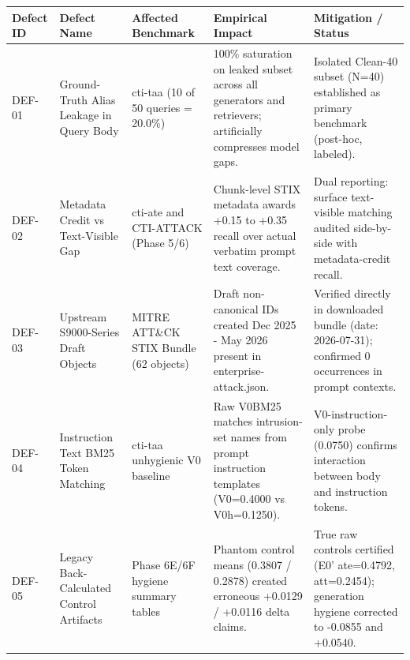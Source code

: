 \begin{tabular}{lllll}
\toprule
Defect ID & Defect Name & Affected Benchmark & Empirical Impact & Mitigation / Status \\
\midrule
DEF-01 & Ground-Truth Alias Leakage in Query Body & cti-taa (10 of 50 queries = 20.0\%) & 100\% saturation on leaked subset across all generators and retrievers; artificially compresses model gaps. & Isolated Clean-40 subset (N=40) established as primary benchmark (post-hoc, labeled). \\
DEF-02 & Metadata Credit vs Text-Visible Gap & cti-ate and CTI-ATTACK (Phase 5/6) & Chunk-level STIX metadata awards +0.15 to +0.35 recall over actual verbatim prompt text coverage. & Dual reporting: surface text-visible matching audited side-by-side with metadata-credit recall. \\
DEF-03 & Upstream S9000-Series Draft Objects & MITRE ATT\&CK STIX Bundle (62 objects) & Draft non-canonical IDs created Dec 2025 - May 2026 present in enterprise-attack.json. & Verified directly in downloaded bundle (date: 2026-07-31); confirmed 0 occurrences in prompt contexts. \\
DEF-04 & Instruction Text BM25 Token Matching & cti-taa unhygienic V0 baseline & Raw V0BM25 matches intrusion-set names from prompt instruction templates (V0=0.4000 vs V0h=0.1250). & V0-instruction-only probe (0.0750) confirms interaction between body and instruction tokens. \\
DEF-05 & Legacy Back-Calculated Control Artifacts & Phase 6E/6F hygiene summary tables & Phantom control means (0.3807 / 0.2878) created erroneous +0.0129 / +0.0116 delta claims. & True raw controls certified (E0' ate=0.4792, att=0.2454); generation hygiene corrected to -0.0855 and +0.0540. \\
\bottomrule
\end{tabular}
